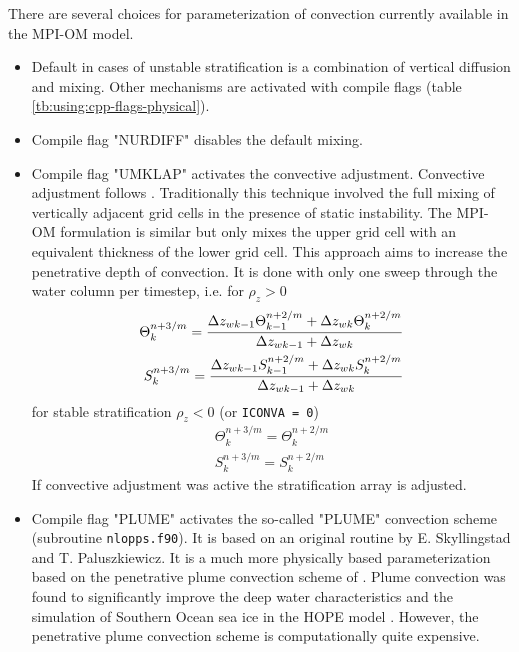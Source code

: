 There are several choices for parameterization of convection currently available in the \mbox{MPI-OM} model.
\begin{itemize}
\item
Default in cases of unstable stratification is a combination of vertical diffusion and mixing.
Other mechanisms are activated with compile flags (table \ref{tb:using:cpp-flags-physical}). 
\item
Compile flag "NURDIFF" disables the default mixing.
\item
Compile flag "UMKLAP" activates the convective adjustment. 
Convective adjustment follows \citet{bryan69}.
Traditionally this technique involved the full mixing of vertically adjacent grid cells 
in the presence of static instability.
The \mbox{MPI-OM} formulation is similar but only mixes the upper grid cell with an equivalent thickness
of the lower grid cell.
This approach aims to increase the penetrative depth of convection.
It is done with only one sweep through the water column per timestep, i.e.
for $\rho_z > 0$
\begin{eqnarray}
\Theta_k^{n+3/m} = {{\displaystyle \Delta z_{wk-1}\Theta_{k-1}^{n+2/m}+\Delta z_{wk}\Theta_{k}^{n+2/m}}\over
               {\displaystyle \Delta z_{wk-1}+\Delta z_{wk}}}\\
S_k^{n+3/m} = {{\displaystyle \Delta z_{wk-1}S_{k-1}^{n+2/m}+\Delta z_{wk}S_{k}^{n+2/m}}\over
               {\displaystyle \Delta z_{wk-1}+\Delta z_{wk}}}
\end{eqnarray}
for stable stratification $\rho_z < 0$ (or {\tt ICONVA = 0})
\begin{eqnarray}
\Theta_k^{n+3/m} =\Theta_{k}^{n+2/m}\\
S_k^{n+3/m} =S_{k}^{n+2/m}
\end{eqnarray}
If convective adjustment was active the stratification array is adjusted.

\item
Compile flag "PLUME" activates the so-called "PLUME" convection scheme (subroutine \texttt{nlopps.f90}). 
It is based on an original routine by E. Skyllingstad and T. Paluszkiewicz.
It is a much more physically based parameterization based on the
penetrative plume convection scheme of \citet{paluszkiewicz97}.
Plume convection was found to significantly improve the deep water characteristics and
the simulation of Southern Ocean sea ice in the {HOPE} model \citep{kim2001}.
However, the penetrative plume convection scheme is computationally quite expensive.


\end{itemize}
